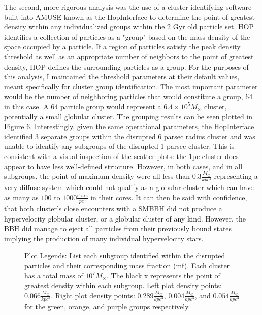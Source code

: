 \documentclass{aastex62}
\begin{document}
The second, more rigorous analysis was the use of a cluster-identifying software built into AMUSE known as the HopInterface \citep{eisen98} to determine the point of greatest density within any individualized groups within the 2 Gyr old particle set. HOP identifies a collection of particles as a "group" based on the mass density of the space occupied by a particle. If a region of particles satisfy the peak density threshold as well as an appropriate number of neighbors to the point of greatest density, HOP defines the surrounding particles as a group. For the purposes of this analysis, I maintained the threshold parameters at their default values, meant specifically for cluster group identification. The most important parameter would be the number of neighboring particles that would constitute a group, 64 in this case. A 64 particle group would represent a $6.4\times10^5 M_{\odot}$ cluster, potentially a small globular cluster. The grouping results can be seen plotted in Figure 6. Interestingly, given the same operational parameters, the HopInterface identified 3 separate groups within the disrupted 6 parsec radius cluster and was unable to identify any subgroups of the disrupted 1 parsec cluster. This is consistent with a visual inspection of the scatter plots: the 1pc cluster does appear to have less well-defined structure. However, in both cases, and in all subgroups, the point of maximum density were all less than $0.3 \frac{M_{\odot}}{kpc^3}$ representing a very diffuse system which could not qualify as a globular cluster which can have as many as $100$ to $1000 \frac{\text{stars}}{pc^3}$ in their cores. It can then be said with confidence, that both cluster's close encounters with a SMBBH did not produce a hypervelocity globular cluster, or a globular cluster of any kind. However, the BBH did manage to eject all particles from their previously bound states implying the production of many individual hypervelocity stars.

\begin{figure}
\centering
\caption{Plot Legends: List each subgroup identified within the disrupted particles and their corresponding mass fraction (mf). Each cluster has a total mass of $10^7 M_{\odot}$. The black x represents the point of greatest density within each subgroup. Left plot density points: $0.066 \frac{M_{\odot}}{kpc^3}$. Right plot density points: $0.289 \frac{M_{\odot}}{kpc^3}$, $0.004 \frac{M_{\odot}}{kpc^3}$, and $0.054 \frac{M_{\odot}}{kpc^3}$ for the green, orange, and purple groups respectively.\label{fig7}}
\end{figure}
\end{document}
